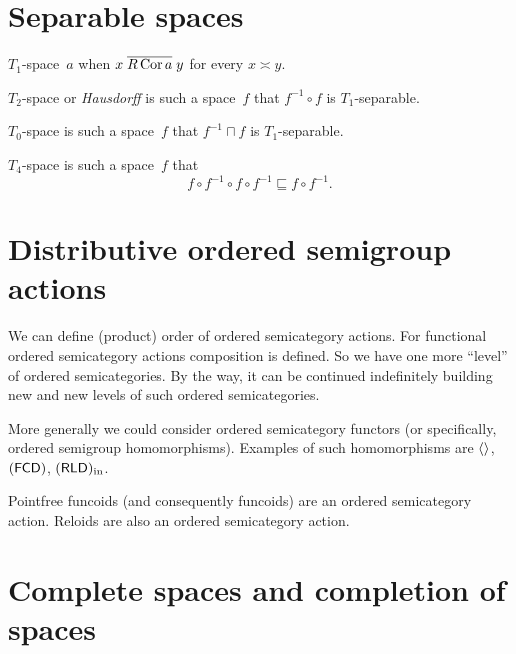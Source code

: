 % 

\chapter{Separable spaces}

$T_1$-space~$a$ when $x\mathrel{\overline{R\operatorname{Cor} a}}y$ for every $x\asymp y$.

$T_2$-space or \emph{Hausdorff} is such a space~$f$ that $f^{-1}\circ f$ is $T_1$-separable.

$T_0$-space is such a space~$f$ that $f^{-1}\sqcap f$ is $T_1$-separable.

$T_4$-space is such a space~$f$ that \[ f\circ f^{-1}\circ f\circ f^{-1}\sqsubseteq f\circ f^{-1}. \]

\chapter{Distributive ordered semigroup actions}

We can define (product) order of ordered semicategory actions. For functional ordered semicategory actions composition is defined. So we have one more ``level'' of ordered semicategories. By the way, it can be continued indefinitely building new and new levels of such ordered semicategories.

More generally we could consider ordered semicategory functors (or specifically, ordered semigroup homomorphisms). Examples of such homomorphisms are $\left\langle \right\rangle$, $(\mathsf{FCD})$, $(\mathsf{RLD})_{\mathrm{in}}$.

Pointfree funcoids (and consequently funcoids) are an ordered semicategory action. Reloids are also an ordered semicategory action.

\chapter{Complete spaces and completion of spaces}

